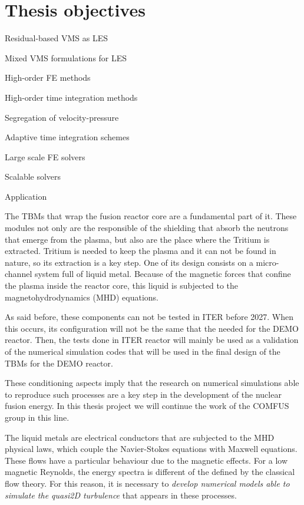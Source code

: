 \section{Thesis objectives}

Residual-based VMS as LES

Mixed VMS formulations for LES

High-order FE methods

High-order time integration methods

Segregation of velocity-pressure

Adaptive time integration schemes

Large scale FE solvers

Scalable solvers

Application

The TBMs that wrap the fusion reactor core are a fundamental part of it. These modules not only are the responsible of the shielding that absorb the neutrons that emerge from the plasma, but also are the place where the Tritium is extracted. Tritium is needed to keep the plasma and it can not be found in nature, so its extraction is a key step. One of its design consists on a micro-channel system full of  liquid metal. Because of the magnetic forces that confine the plasma inside the reactor core, this liquid is subjected to the magnetohydrodynamics (MHD) equations.

As said before, these components can not be tested in ITER before 2027. When this occurs, its configuration will not be the same that the needed for the DEMO reactor. Then, the tests done in ITER reactor will mainly be used as a validation of the numerical simulation codes that will be used in the final design of the TBMs for the DEMO reactor.

These conditioning aspects imply that the research on numerical simulations able to reproduce such processes are a key step in the development of the nuclear fusion energy. In this thesis project we will continue the work of the COMFUS group in this line.

The liquid metals are electrical conductors that are subjected to the MHD physical laws, which couple the Navier-Stokes equations with Maxwell equations. These flows have a particular behaviour due to the magnetic effects. For a low magnetic Reynolds, the energy spectra is different of the defined by the classical flow theory. For this reason, it is necessary to \emph{develop numerical models able to simulate the quasi2D turbulence} that appears in these processes.

